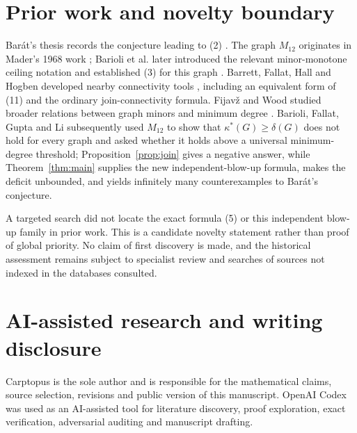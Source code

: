 \documentclass[11pt]{article}
\begin{document}
\section{Prior work and novelty boundary}


Barát's thesis records the conjecture leading to (2) \cite{barat}. The graph $M_{12}$
originates in Mader's 1968 work \cite{mader1968}; Barioli et al. later introduced the relevant
minor-monotone ceiling notation and established (3) for this graph \cite{barioli2013}. Barrett,
Fallat, Hall and Hogben developed nearby connectivity tools \cite{barrett2013},
including an equivalent form of (11) and the ordinary join-connectivity
formula. Fijav\v{z} and Wood studied broader relations between graph minors and
minimum degree \cite{fijavz2010}. Barioli, Fallat, Gupta and Li subsequently used $M_{12}$ \cite{barioli2026} to
show that $\kappa^*(G)\geq\delta(G)$ does not hold for every graph and asked
whether it holds above a universal minimum-degree threshold; Proposition~\ref{prop:join}
gives a negative answer, while Theorem~\ref{thm:main} supplies the new independent-blow-up
formula, makes the deficit unbounded, and yields infinitely many counterexamples
to Barát's conjecture.

A targeted search did not locate the exact formula (5) or this independent
blow-up family in prior work. This is a candidate novelty statement rather
than proof of global priority. No claim of first discovery is made, and the
historical assessment remains subject to specialist review and searches of
sources not indexed in the databases consulted.

\section*{AI-assisted research and writing disclosure}


Carptopus is the sole author and is responsible for the mathematical claims,
source selection, revisions and public version of this manuscript. OpenAI
Codex was used as an AI-assisted tool for literature discovery, proof
exploration, exact verification, adversarial auditing and manuscript drafting.
\end{document}

